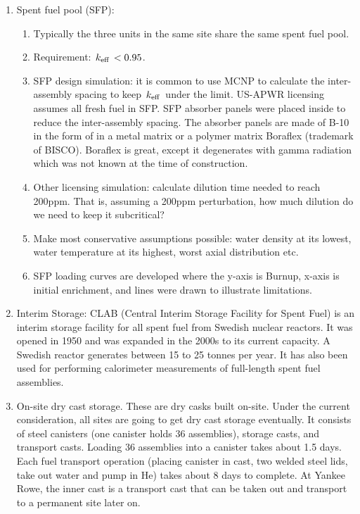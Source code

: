 \documentclass{school-22.211-notes}
\begin{document}
\begin{enumerate}

\item Spent fuel pool (SFP): 
  \begin{enumerate}
    \item Typically the three units in the same site share the same
      spent fuel pool.
      
    \item Requirement: $\left. k_{\mathrm{eff}} \right. < 0.95$. 

    \item SFP design simulation: it is common to use MCNP to calculate
      the inter-assembly spacing to keep $\left. k_{\mathrm{eff}} \right.$ under the
      limit. US-APWR licensing assumes all fresh fuel in SFP. SFP
      absorber panels were placed inside to reduce the inter-assembly
      spacing. The absorber panels are made of B-10 in the form of
       in a metal matrix or a polymer matrix Boraflex
      (trademark of BISCO). Boraflex is great, except it degenerates
      with gamma radiation which was not known at the time of
      construction.

    \item Other licensing simulation: calculate dilution time needed
      to reach 200ppm. That is, assuming a 200ppm perturbation, how
      much dilution do we need to keep it subcritical?

    \item Make most conservative assumptions possible: water density
      at its lowest, water temperature at its highest, worst axial
      distribution etc.

    \item SFP loading curves are developed where the y-axis is Burnup,
      x-axis is initial enrichment, and lines were drawn to illustrate
      limitations. 
  \end{enumerate}

\item Interim Storage: CLAB (Central Interim Storage Facility for
  Spent Fuel) is an interim storage facility for all spent fuel from
  Swedish nuclear reactors. It was opened in 1950 and was expanded in
  the 2000s to its current capacity. A Swedish reactor generates
  between 15 to 25 tonnes per year. It has also been used for
  performing calorimeter measurements of full-length spent fuel
  assemblies.

\item On-site dry cast storage. These are dry casks built
  on-site. Under the current consideration, all sites are going to get
  dry cast storage eventually. It consists of steel canisters (one
  canister holds 36 assemblies), storage casts, and transport
  casts. Loading 36 assemblies into a canister takes about 1.5
  days. Each fuel transport operation (placing canister in cast, two
  welded steel lids, take out water and pump in He) takes about 8 days
  to complete. At Yankee Rowe, the inner cast is a transport cast that
  can be taken out and transport to a permanent site later on.
\end{enumerate}
\end{document}
